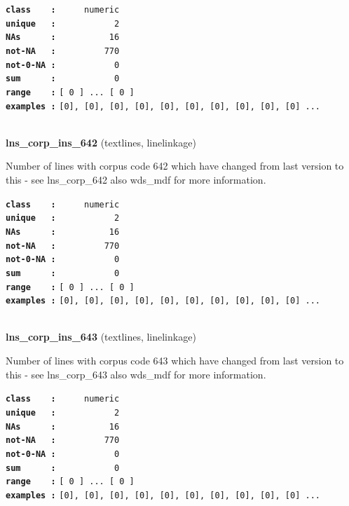 \documentclass[]{article}
\begin{document}
\textbf{\texttt{class\ \ \ \ :}} \texttt{~~~~~numeric}\\
\textbf{\texttt{unique\ \ \ :}} \texttt{~~~~~~~~~~~2}\\
\textbf{\texttt{NAs\ \ \ \ \ \ :}} \texttt{~~~~~~~~~~16}\\
\textbf{\texttt{not-NA\ \ \ :}} \texttt{~~~~~~~~~770}\\
\textbf{\texttt{not-0-NA\ :}} \texttt{~~~~~~~~~~~0}\\
\textbf{\texttt{sum\ \ \ \ \ \ :}} \texttt{~~~~~~~~~~~0}\\
\textbf{\texttt{range\ \ \ \ :}}
\texttt{{[}\ 0\ {]}\ ...\ {[}\ 0\ {]}}\\
\textbf{\texttt{examples\ :}}
\texttt{{[}0{]},\ {[}0{]},\ {[}0{]},\ {[}0{]},\ {[}0{]},\ {[}0{]},\ {[}0{]},\ {[}0{]},\ {[}0{]},\ {[}0{]}\ ...}\\

~

\textbf{lns\_corp\_ins\_642} (textlines, linelinkage)

Number of lines with corpus code 642 which have changed from last
version to this - see lns\_corp\_642 also wds\_mdf for more information.

\textbf{\texttt{class\ \ \ \ :}} \texttt{~~~~~numeric}\\
\textbf{\texttt{unique\ \ \ :}} \texttt{~~~~~~~~~~~2}\\
\textbf{\texttt{NAs\ \ \ \ \ \ :}} \texttt{~~~~~~~~~~16}\\
\textbf{\texttt{not-NA\ \ \ :}} \texttt{~~~~~~~~~770}\\
\textbf{\texttt{not-0-NA\ :}} \texttt{~~~~~~~~~~~0}\\
\textbf{\texttt{sum\ \ \ \ \ \ :}} \texttt{~~~~~~~~~~~0}\\
\textbf{\texttt{range\ \ \ \ :}}
\texttt{{[}\ 0\ {]}\ ...\ {[}\ 0\ {]}}\\
\textbf{\texttt{examples\ :}}
\texttt{{[}0{]},\ {[}0{]},\ {[}0{]},\ {[}0{]},\ {[}0{]},\ {[}0{]},\ {[}0{]},\ {[}0{]},\ {[}0{]},\ {[}0{]}\ ...}\\

~

\textbf{lns\_corp\_ins\_643} (textlines, linelinkage)

Number of lines with corpus code 643 which have changed from last
version to this - see lns\_corp\_643 also wds\_mdf for more information.

\textbf{\texttt{class\ \ \ \ :}} \texttt{~~~~~numeric}\\
\textbf{\texttt{unique\ \ \ :}} \texttt{~~~~~~~~~~~2}\\
\textbf{\texttt{NAs\ \ \ \ \ \ :}} \texttt{~~~~~~~~~~16}\\
\textbf{\texttt{not-NA\ \ \ :}} \texttt{~~~~~~~~~770}\\
\textbf{\texttt{not-0-NA\ :}} \texttt{~~~~~~~~~~~0}\\
\textbf{\texttt{sum\ \ \ \ \ \ :}} \texttt{~~~~~~~~~~~0}\\
\textbf{\texttt{range\ \ \ \ :}}
\texttt{{[}\ 0\ {]}\ ...\ {[}\ 0\ {]}}\\
\textbf{\texttt{examples\ :}}
\texttt{{[}0{]},\ {[}0{]},\ {[}0{]},\ {[}0{]},\ {[}0{]},\ {[}0{]},\ {[}0{]},\ {[}0{]},\ {[}0{]},\ {[}0{]}\ ...}\\
\end{document}
